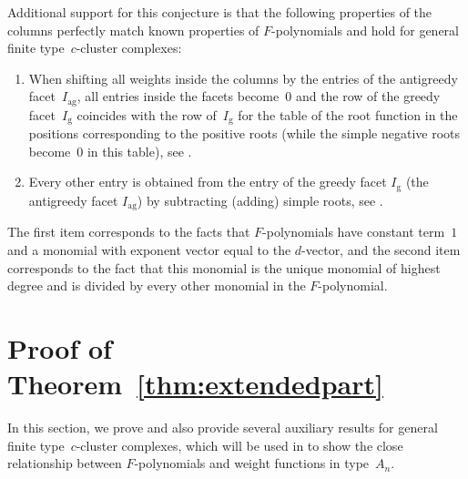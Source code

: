 \documentclass[ALCO,Unicode,ThmDefs]{cedram}
\newcommand{\greedy}{I_{\operatorname{g}}}
\newcommand{\antigreedy}{I_{\operatorname{ag}}}
\begin{document}
\begin{exem}
Additional support for this conjecture is that the following properties of the columns perfectly match known properties of $F$-polynomials and hold for general finite type~$c$-cluster complexes:
\begin{enumerate}%
\item When shifting all weights inside the columns by the entries of the antigreedy facet~$\antigreedy$, all entries inside the facets become~$0$ and the row of the greedy facet~$\greedy$ coincides with the row of~$\greedy$ for the table of the root function in the positions corresponding to the positive roots (while the simple negative roots become~$0$ in this table), see .
\item Every other entry is obtained from the entry of the greedy facet $\greedy$ (the antigreedy facet $\antigreedy$) by subtracting (adding) simple roots, see .
\end{enumerate}
The first item corresponds to the facts that $F$-polynomials have constant term~$1$ and a monomial with exponent vector equal to the $d$-vector, and the second item corresponds to the fact that this monomial is the unique monomial of highest degree and is divided by every other monomial in the $F$-polynomial.
\end{exem}


\section{Proof of Theorem~\ref{thm:extendedpart}}\label{sec:proofextendedpart}

In this section, we prove  and also provide several auxiliary results for general finite type~$c$-cluster complexes, which will be used in  to show the close relationship between $F$-polynomials and weight functions in type~$A_n$.
\end{document}
